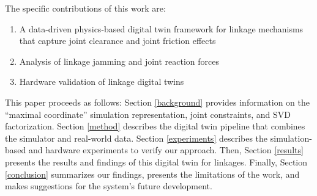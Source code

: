 
The specific contributions of this work are: 
\begin{enumerate}
    \item A data-driven physics-based digital twin framework for linkage mechanisms that capture joint clearance and joint friction effects 
    \item Analysis of linkage jamming and joint reaction forces 
    \item Hardware validation of linkage digital twins 
\end{enumerate}

This paper proceeds as follows: Section \ref{background} provides information on the ``maximal coordinate'' simulation representation, joint constraints, and SVD factorization. Section \ref{method} describes the digital twin pipeline that combines the simulator and real-world data. Section \ref{experiments} describes the simulation-based and hardware experiments to verify our approach. Then, Section \ref{results} presents the results and findings of this digital twin for linkages. Finally, Section \ref{conclusion} summarizes our findings, presents the limitations of the work, and makes suggestions for the system's future development.